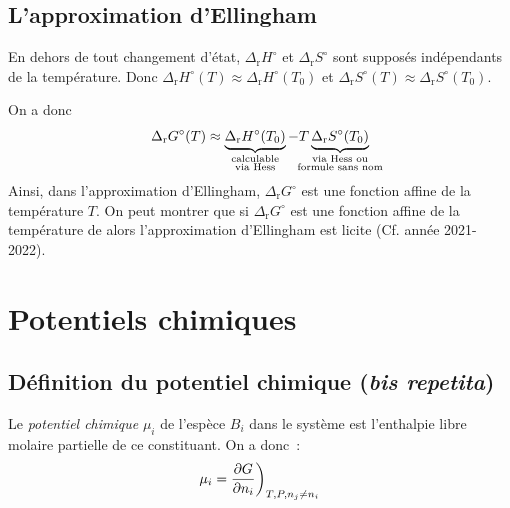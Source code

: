 \documentclass{article}
\newcommand{\Dr}{\Delta_{\mathrm{r}}}
\begin{document}
\subsection{L'approximation d'Ellingham}
\begin{enonce}
    En dehors de tout changement d'état, $\Dr H^\circ$ et $\Dr S^\circ$ sont supposés indépendants de la température. Donc $\Dr H^\circ(T) \approx \Dr H^\circ(T_0)$ et $\Dr S^\circ(T) \approx \Dr S^\circ(T_0)$.
\end{enonce}
\begin{tableau}
    On a donc
    $$\Dr G^\circ(T) \approx \underbrace{\Dr H^\circ(T_0)}_{\mathclap{\substack{\text{calculable}\\\text{via Hess}}}} - T \underbrace{\Dr S^\circ(T_0)}_{\mathclap{\substack{\text{via Hess ou}\\\text{formule sans nom}}}}$$
    Ainsi, dans l'approximation d'Ellingham, $\Dr G^\circ$ est une fonction affine de la température $T$. On peut montrer que si $\Dr G^\circ$ est une fonction affine de la température de alors l'approximation d'Ellingham est licite (Cf. année 2021-2022).
\end{tableau}


\section{Potentiels chimiques}
\subsection{Définition du potentiel chimique (\textit{bis repetita})}
\begin{tableau}
    \begin{enonce}
        Le \textit{potentiel chimique} $\mu_i$ de l'espèce $B_i$ dans le système est l'enthalpie libre molaire partielle de ce constituant. On a donc~:
        $$\mu_i = \pdv{G}{n_i}\bigg)_{T,P,n_j\neq n_i}$$
    \end{enonce}
\end{tableau}
\end{document}

